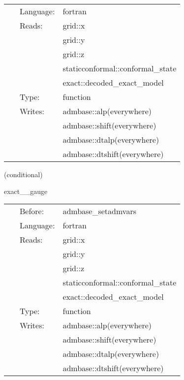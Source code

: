 \hspace{5mm}{\it set evolution lapse and/or shift from exact solution on a trivial slice } 


\hspace{5mm}

 \begin{tabular*}{160mm}{cll} 
~ & Language:  & fortran \\ 
~ & Reads:  & grid::x \\ 
~& ~ &grid::y\\ 
~& ~ &grid::z\\ 
~& ~ &staticconformal::conformal\_state\\ 
~& ~ &exact::decoded\_exact\_model\\ 
~ & Type:  & function \\ 
~ & Writes:  & admbase::alp(everywhere) \\ 
~& ~ &admbase::shift(everywhere)\\ 
~& ~ &admbase::dtalp(everywhere)\\ 
~& ~ &admbase::dtshift(everywhere)\\ 
\end{tabular*} 


\vspace{5mm}

   (conditional) 

\hspace{5mm} exact\_\_gauge 

\hspace{5mm}{\it set evolution lapse and/or shift from exact solution on a trivial slice } 


\hspace{5mm}

 \begin{tabular*}{160mm}{cll} 
~ & Before:  & admbase\_setadmvars \\ 
~ & Language:  & fortran \\ 
~ & Reads:  & grid::x \\ 
~& ~ &grid::y\\ 
~& ~ &grid::z\\ 
~& ~ &staticconformal::conformal\_state\\ 
~& ~ &exact::decoded\_exact\_model\\ 
~ & Type:  & function \\ 
~ & Writes:  & admbase::alp(everywhere) \\ 
~& ~ &admbase::shift(everywhere)\\ 
~& ~ &admbase::dtalp(everywhere)\\ 
~& ~ &admbase::dtshift(everywhere)\\ 
\end{tabular*} 


